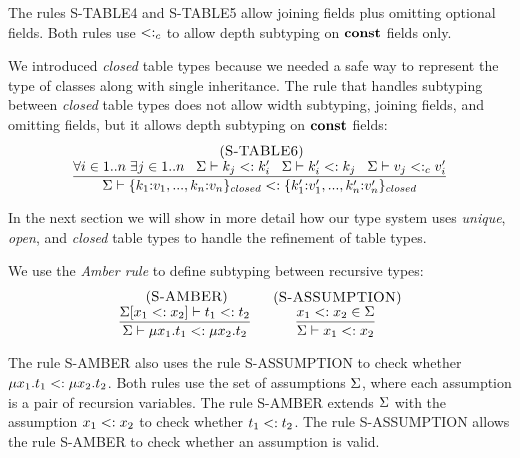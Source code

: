 The rules \textsc{S-TABLE4} and \textsc{S-TABLE5} allow joining fields
plus omitting optional fields.
Both rules use $<:_{c}$ to allow depth subtyping on $\mathbf{const}$ fields only.

We introduced \emph{closed} table types because we needed a safe way
to represent the type of classes along with single inheritance.
The rule that handles subtyping between \emph{closed} table types
does not allow width subtyping, joining fields, and omitting fields,
but it allows depth subtyping on $\mathbf{const}$ fields:
\[
\begin{array}{c}
\; (\textsc{S-TABLE6})\\
\dfrac{\forall i \in 1..n \; \exists j \in 1..n \;\;\;
       \Sigma \vdash k_{j} <: k_{i}' \;\;\;
       \Sigma \vdash k_{i}' <: k_{j} \;\;\;
       \Sigma \vdash v_{j} <:_{c} v_{i}'}
      {\Sigma \vdash \{k_{1}{:}v_{1}, ..., k_{n}{:}v_{n}\}_{closed} <: \{k_{1}'{:}v_{1}', ..., k_{n}'{:}v_{n}'\}_{closed}}
\end{array}
\]

In the next section we will show in more detail how our type system
uses \emph{unique}, \emph{open}, and \emph{closed} table types to
handle the refinement of table types.

We use the \emph{Amber rule} \citep{cardelli1986amber} to define
subtyping between recursive types:
\[
\begin{array}{c}
\begin{array}{c}
\; (\textsc{S-AMBER})\\
\dfrac{\Sigma[x_{1} <: x_{2}] \vdash t_{1} <: t_{2}}
      {\Sigma \vdash \mu x_{1}.t_{1} <: \mu x_{2}.t_{2}}
\end{array}
\;
\begin{array}{c}
\; (\textsc{S-ASSUMPTION})\\
\dfrac{x_{1} <: x_{2} \in \Sigma}
      {\Sigma \vdash x_{1} <: x_{2}}
\end{array}
\end{array}
\]

The rule \textsc{S-AMBER} also uses the rule \textsc{S-ASSUMPTION}
to check whether $\mu x_{1}.t_{1} <: \mu x_{2}.t_{2}$.
Both rules use the set of assumptions $\Sigma$,
where each assumption is a pair of recursion variables.
The rule \textsc{S-AMBER} extends $\Sigma$ with the assumption
$x_{1} <: x_{2}$ to check whether $t_{1} <: t_{2}$.
The rule \textsc{S-ASSUMPTION} allows the rule \textsc{S-AMBER}
to check whether an assumption is valid.

